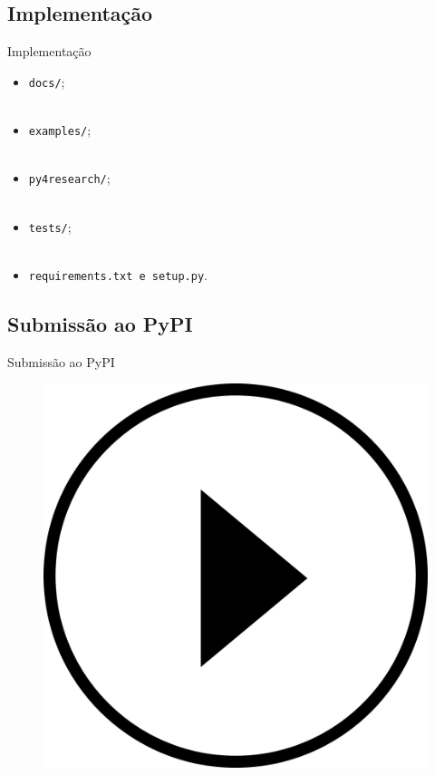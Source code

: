 \subsection{Implementação}
\label{ss.implementation}

\begin{frame}{Implementação}
	\justify
	\begin{itemize}
		\item<1> \texttt{docs/};
		\\~\\
		\item<2> \texttt{examples/};
		\\~\\
		\item<3> \texttt{py4research/};
		\\~\\
		\item<4> \texttt{tests/};
		\\~\\
		\item<5> \texttt{requirements.txt e setup.py}.
	\end{itemize}
\end{frame}

\subsection{Submissão ao PyPI}
\label{ss.pypi_submission}

\begin{frame}{Submissão ao PyPI}
	\begin{figure}
		\centering
		\includegraphics[scale=0.125]{figs/video_play.png}
	\end{figure}
\end{frame}

